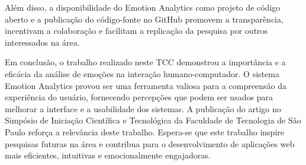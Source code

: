 Além disso, a disponibilidade do Emotion Analytics como projeto de código aberto e a publicação do código-fonte no GitHub \cite{22}\cite{23} promovem a transparência, incentivam a colaboração e facilitam a replicação da pesquisa por outros interessados na área.

Em conclusão, o trabalho realizado neste TCC demonstrou a importância e a eficácia da análise de emoções na interação humano-computador. O sistema Emotion Analytics provou ser uma ferramenta valiosa para a compreensão da experiência do usuário, fornecendo percepções que podem ser usados para melhorar a interface e a usabilidade dos sistemas. A publicação do artigo no Simpósio de Iniciação Científica e Tecnológica da Faculdade de Tecnologia de São Paulo reforça a relevância deste trabalho. Espera-se que este trabalho inspire pesquisas futuras na área e contribua para o desenvolvimento de aplicações web mais eficientes, intuitivas e emocionalmente engajadoras.
